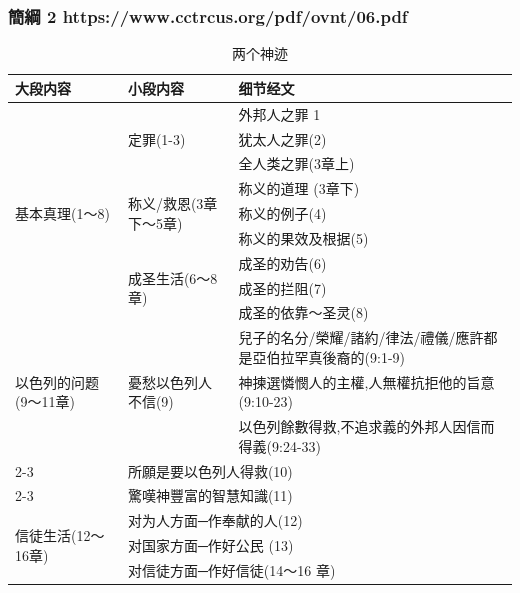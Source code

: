 \subsubsection{簡綱 2 https://www.cctrcus.org/pdf/ovnt/06.pdf}
\begin{table}[H]
\centering
\begin{tabular}{p{14em}|p{13em}|p{}}\toprule

大段内容&小段内容&细节经文\\\midrule\midrule
\multirow{9}{*}{基本真理(1〜8)}&\multirow{3}{*}{定罪(1-3)}&外邦人之罪 1\\\cline{3-3}
&&犹太人之罪(2)\\\cline{3-3}
&&全人类之罪(3章上)\\\cline{2-3}

&\multirow{3}{*}{称义/救恩(3章下〜5章)}&称义的道理 (3章下)\\\cline{3-3}
&&称义的例子(4)\\\cline{3-3}
&&称义的果效及根据(5)\\\cline{2-3}

&\multirow{3}{*}{成圣生活(6〜8章)}&成圣的劝告(6)\\\cline{3-3}
&&成圣的拦阻(7)\\\cline{3-3}
&&成圣的依靠〜圣灵(8)\\\hline

\multirow{3}{*}{以色列的问题(9〜11章)}&\multirow{3}{*}{憂愁以色列人不信(9)}&兒子的名分/榮耀/諸約/律法/禮儀/應許都是亞伯拉罕真後裔的(9:1-9) \\\cline{3-3}
&&神揀選憐憫人的主權,人無權抗拒他的旨意(9:10-23)\\\cline{3-3}
&&以色列餘數得救,不追求義的外邦人因信而得義(9:24-33)\\\cline{2-3}


&\multicolumn{2}{l}{所願是要以色列人得救(10)}\\\cline{2-3}
&\multicolumn{2}{l}{驚嘆神豐富的智慧知識(11)}\\\hline

\multirow{3}{*}{信徒生活(12〜16章)}&\multicolumn{2}{l}{对为人方面─作奉献的人(12)}\\\cline{2-3}
&\multicolumn{2}{l}{对国家方面─作好公民 (13)}\\\cline{2-3}
&\multicolumn{2}{l}{对信徒方面─作好信徒(14〜16 章)}\\\hline
\end{tabular}
\caption{两个神迹}
\end{table}



